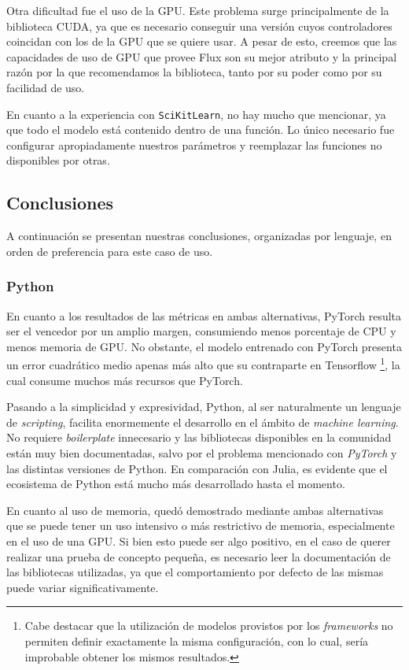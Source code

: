 \documentclass[11pt]{article}
\let\Oldsubsection\subsection
\renewcommand{\subsection}{\FloatBarrier\Oldsubsection}
\let\Oldsubsubsection\subsubsection
\renewcommand{\subsubsection}{\FloatBarrier\Oldsubsubsection}
\newcommand{\english}[1]{\textit{#1}}
\begin{document}
Otra dificultad fue el uso de la GPU. Este problema surge principalmente de la biblioteca CUDA, ya que es necesario conseguir una versión cuyos controladores coincidan con los de la GPU que se quiere usar. A pesar de esto, creemos que las capacidades de uso de GPU que provee Flux son su mejor atributo y la principal razón por la que recomendamos la biblioteca, tanto por su poder como por su facilidad de uso.

En cuanto a la experiencia con \lstinline{SciKitLearn}, no hay mucho que mencionar, ya que todo el modelo está contenido dentro de una función. Lo único necesario fue configurar apropiadamente nuestros parámetros y reemplazar las funciones no disponibles por otras.

\subsection{Conclusiones}

A continuación se presentan nuestras conclusiones, organizadas por lenguaje, en orden de preferencia para este caso de uso.

\subsubsection{Python}

En cuanto a los resultados de las métricas en ambas alternativas, PyTorch resulta ser el vencedor por un amplio margen, consumiendo menos porcentaje de CPU y menos memoria de GPU. No obstante, el modelo entrenado con PyTorch presenta un error cuadrático medio apenas más alto que su contraparte en Tensorflow \footnote{Cabe destacar que la utilización de modelos provistos por los \english{frameworks} no permiten definir exactamente la misma configuración, con lo cual, sería improbable obtener los mismos resultados.}, la cual consume muchos más recursos que PyTorch.

Pasando a la simplicidad y expresividad, Python, al ser naturalmente un lenguaje de \english{scripting}, facilita enormemente el desarrollo en el ámbito de \english{machine learning}. No requiere \textit{boilerplate} innecesario y las bibliotecas disponibles en la comunidad están muy bien documentadas, salvo por el problema mencionado con \textit{PyTorch} y las distintas versiones de Python. En comparación con Julia, es evidente que el ecosistema de Python está mucho más desarrollado hasta el momento.

En cuanto al uso de memoria, quedó demostrado mediante ambas alternativas que se puede tener un uso intensivo o más restrictivo de memoria, especialmente en el uso de una GPU. Si bien esto puede ser algo positivo, en el caso de querer realizar una prueba de concepto pequeña, es necesario leer la documentación de las bibliotecas utilizadas, ya que el comportamiento por defecto de las mismas puede variar significativamente.
\end{document}

